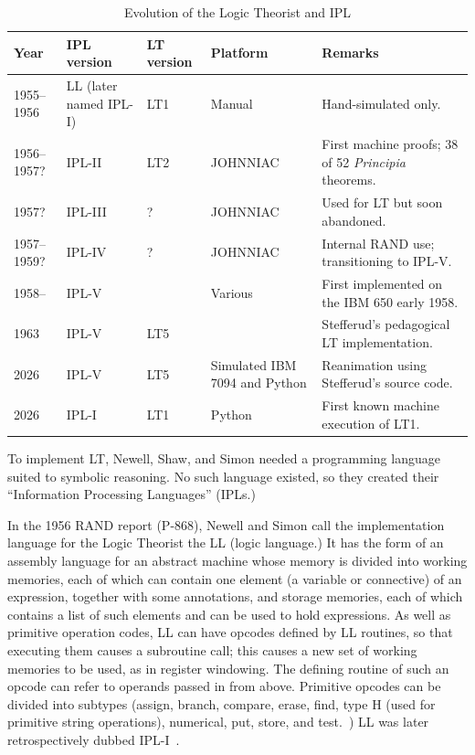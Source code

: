 \documentclass[journal]{IEEEtran}
\begin{document}
\begin{table}[h]
\centering
\caption{Evolution of the Logic Theorist and IPL}
\label{tab:lt_versions}
\begin{tabular}{@{}lllll@{}}
\toprule
\textbf{Year} & \textbf{IPL version} & \textbf{LT version} & \textbf{Platform} & \textbf{Remarks} \\ \midrule
1955--1956 & LL (later named IPL-I) & LT1 & Manual & Hand-simulated only. \\
1956--1957? & IPL-II & LT2 & JOHNNIAC & First machine proofs; 38 of 52 \textit{Principia} theorems. \\
1957? & IPL-III & ? & JOHNNIAC & Used for LT but soon abandoned. \\
1957--1959? & IPL-IV & ? & JOHNNIAC & Internal RAND use; transitioning to IPL-V. \\
1958-- & IPL-V & \ & Various & First implemented on the IBM 650 early 1958. \\
1963 & IPL-V & LT5 & \ & Stefferud's pedagogical LT implementation. \\
2026 & IPL-V & LT5 & Simulated IBM 7094 and Python & Reanimation using Stefferud's source code. \\
2026 & IPL-I & LT1 & Python & First known machine execution of LT1. \\ \bottomrule
\end{tabular}
\end{table}

To implement LT, Newell, Shaw, and Simon needed a programming language
suited to symbolic reasoning. No such language existed, so they
created their ``Information Processing Languages'' (IPLs.)

In the 1956 RAND report (P-868), Newell and Simon call the implementation
language for the Logic Theorist the LL (logic language.) It has the
form of an assembly language for an abstract machine whose memory
is divided into working memories, each of which can contain one
element (a variable or connective) of an expression, together with
some annotations, and storage memories, each of which contains a
list of such elements and can be used to hold expressions.  As well
as primitive operation codes, LL can have opcodes defined by LL
routines, so that executing them causes a subroutine call; this
causes a new set of working memories to be used, as in register
windowing.  The defining routine of such an opcode can refer to
operands passed in from above.  Primitive opcodes can be divided
into subtypes (assign, branch, compare, erase, find, type H (used
for primitive string operations), numerical, put, store, and
test.~\cite{LT1956b}) LL was later retrospectively dubbed
IPL-I~\cite[p.~166]{mccorduck2004machines}.
\end{document}
